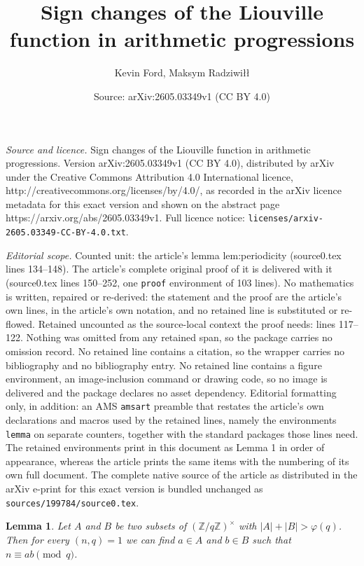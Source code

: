 \documentclass[10pt,a4paper]{amsart}
\title{Sign changes of the Liouville function in arithmetic progressions}
\author{Kevin Ford, Maksym Radziwi{\l}{\l}}
\date{Source: arXiv:2605.03349v1 (CC BY 4.0)}
\newtheorem{lemma}{Lemma}
\begin{document}
\maketitle

\noindent\emph{Source and licence.} Sign changes of the Liouville function in arithmetic progressions. Version arXiv:2605.03349v1 (CC BY 4.0), distributed by arXiv under the Creative Commons Attribution 4.0 International licence, http://creativecommons.org/licenses/by/4.0/, as recorded in the arXiv licence metadata for this exact version and shown on the abstract page https://arxiv.org/abs/2605.03349v1. Full licence notice: \texttt{licenses/arxiv-2605.03349-CC-BY-4.0.txt}.\par\smallskip

\noindent\textit{Editorial scope.} Counted unit: the article's lemma lem:periodicity (source0.tex lines 134--148). The article's complete original proof of it is delivered with it (source0.tex lines 150--252, one \texttt{proof} environment of 103 lines). No mathematics is written, repaired or re-derived: the statement and the proof are the article's own lines, in the article's own notation, and no retained line is substituted or re-flowed.  Retained uncounted as the source-local context the proof needs: lines 117--122.  Nothing was omitted from any retained span, so the package carries no omission record.  No retained line contains a citation, so the wrapper carries no bibliography and no bibliography entry.  No retained line contains a figure environment, an image-inclusion command or drawing code, so no image is delivered and the package declares no asset dependency.  Editorial formatting only, in addition: an AMS \texttt{amsart} preamble that restates the article's own declarations and macros used by the retained lines, namely the environments \texttt{lemma} on separate counters, together with the standard packages those lines need.  The retained environments print in this document as Lemma 1 in order of appearance, whereas the article prints the same items with the numbering of its own full document.  The complete native source of the article as distributed in the arXiv e-print for this exact version is bundled unchanged as \texttt{sources/199784/source0.tex}.
\begin{lemma}\label{lem:comb}
Let $A$ and $B$ be two subsets of $(\mathbb{Z}/q\mathbb{Z})^{\times}$
with $|A|+|B|>\varphi(q)$.
Then for every $(n,q)=1$ we can find $a \in A$ and $b \in B$ such that
$n \equiv ab \pmod{q}$.
\end{lemma} 
\end{document}
